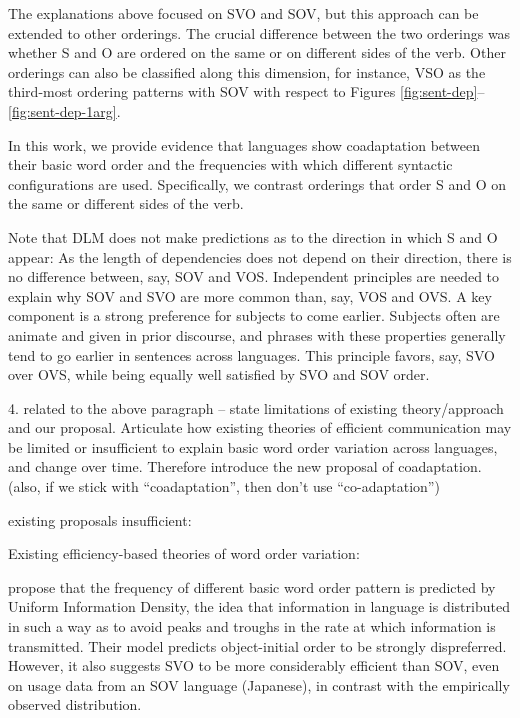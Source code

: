 \documentclass[11pt,a4paper]{article}
\begin{document}
The explanations above focused on SVO and SOV, but this approach can be extended to other orderings.
The crucial difference between the two orderings was whether S and O are ordered on the same or on different sides of the verb.
Other orderings can also be classified along this dimension, for instance, VSO as the third-most ordering patterns with SOV with respect to Figures \ref{fig:sent-dep}--\ref{fig:sent-dep-1arg}.

In this work, we provide evidence that languages show coadaptation between their basic word order and the frequencies with which different syntactic configurations are used.
Specifically, we contrast orderings that order S and O on the same or different sides of the verb.

Note that DLM does not make predictions as to the direction in which S and O appear: As the length of dependencies does not depend on their direction, there is no difference between, say, SOV and VOS.
Independent principles are needed to explain why SOV and SVO are more common than, say, VOS and OVS.
A key component is a strong preference for subjects to come earlier.
Subjects often are animate and given in prior discourse, and phrases with these properties generally tend to go earlier in sentences across languages.
This principle favors, say, SVO over OVS, while being equally well satisfied by SVO and SOV order.





{\color{blue}4. related to the above paragraph -- state limitations of existing theory/approach and our proposal. Articulate how existing theories of efficient communication may be limited or insufficient to explain basic word order variation across languages, and change over time. Therefore introduce the new proposal of coadaptation. (also, if we stick with ``coadaptation'', then don't use ``co-adaptation'') }



existing proposals insufficient:



Existing efficiency-based theories of word order variation:

\cite{maurits2010why} propose that the frequency of different basic word order pattern is predicted by Uniform Information Density, the idea that information in language is distributed in such a way as to avoid peaks and troughs in the rate at which information is transmitted.
Their model predicts object-initial order to be strongly dispreferred.
However, it also suggests SVO to be more considerably efficient than SOV, even on usage data from an SOV language (Japanese), in contrast with the empirically observed distribution.
\end{document}
